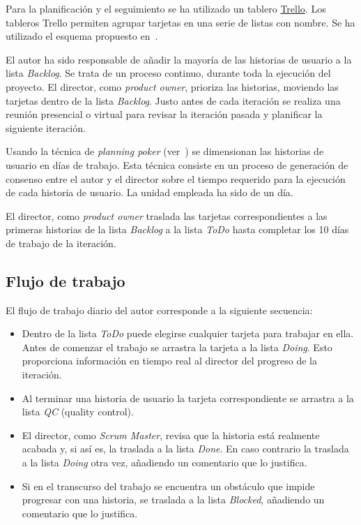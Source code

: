 Para la planificación y el seguimiento se ha utilizado un tablero \href{http://trello.com}{Trello}.  Los tableros Trello permiten agrupar tarjetas en una serie de listas con nombre.  Se ha utilizado el esquema propuesto en~\cite{andrewlittlefield2016}.

El autor ha sido responsable de añadir la mayoría de las historias de usuario a la lista \emph{Backlog}.  Se trata de un proceso continuo, durante toda la ejecución del proyecto.  El director, como \emph{product owner}, prioriza las historias, moviendo las tarjetas dentro de la lista \emph{Backlog}.  Justo antes de cada iteración se realiza una reunión presencial o virtual para revisar la iteración pasada y planificar la siguiente iteración.

Usando la técnica de \emph{planning poker} (ver~\cite{scrumguide}) se dimensionan las historias de usuario en días de trabajo.  Esta técnica consiste en un proceso de generación de consenso entre el autor y el director sobre el tiempo requerido para la ejecución de cada historia de usuario.  La unidad empleada ha sido de un día.

El director, como \emph{product owner} traslada las tarjetas correspondientes a las primeras historias de la lista \emph{Backlog} a la lista \emph{ToDo} hasta completar los 10 días de trabajo de la iteración.

\subsection{Flujo de trabajo}

El flujo de trabajo diario del autor corresponde a la siguiente secuencia:

\begin{itemize}
    \item Dentro de la lista \emph{ToDo} puede elegirse cualquier tarjeta para trabajar en ella.  Antes de comenzar el trabajo se arrastra la tarjeta a la lista \emph{Doing}.  Esto proporciona información en tiempo real al director del progreso de la iteración.
    
    \item Al terminar una historia de usuario la tarjeta correspondiente se arrastra a la lista \emph{QC} (quality control).
    
    \item El director, como \emph{Scrum Master}, revisa que la historia está realmente acabada y, si así es, la traslada a la lista \emph{Done}. En caso contrario la traslada a la lista \emph{Doing} otra vez, añadiendo un comentario que lo justifica.

    \item Si en el transcurso del trabajo se encuentra un obstáculo que impide progresar con una historia, se traslada a la lista \emph{Blocked}, añadiendo un comentario que lo justifica.
\end{itemize}


